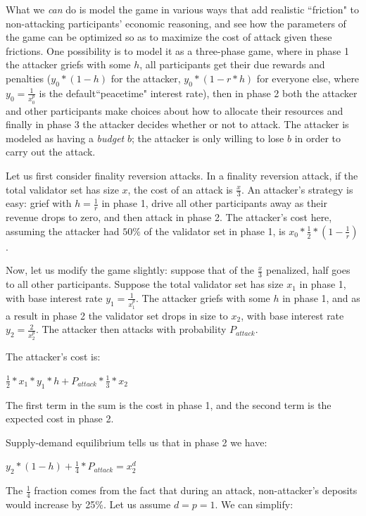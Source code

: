 \documentclass[12pt]{article}
\begin{document}
What we \textit{can} do is model the game in various ways that add realistic ``friction" to non-attacking participants' economic reasoning, and see how the parameters of the game can be optimized so as to maximize the cost of attack given these frictions. One possibility is to model it as a three-phase game, where in phase 1 the attacker griefs with some $h$, all participants get their due rewards and penalties ($y_0 * (1 - h)$ for the attacker, $y_0 * (1- r * h)$ for everyone else, where $y_0 = \frac{1}{x_0^p}$ is the default``peacetime" interest rate), then in phase 2 both the attacker and other participants make choices about how to allocate their resources and finally in phase 3 the attacker decides whether or not to attack. The attacker is modeled as having a \textit{budget} $b$; the attacker is only willing to lose $b$ in order to carry out the attack.

Let us first consider finality reversion attacks. In a finality reversion attack, if the total validator set has size $x$, the cost of an attack is $\frac{x}{3}$. An attacker's strategy is easy: grief with $h = \frac{1}{r}$ in phase 1, drive all other participants away as their revenue drops to zero, and then attack in phase 2. The attacker's cost here, assuming the attacker had $50\%$ of the validator set in phase 1, is $x_0 * \frac{1}{2} * (1 - \frac{1}{r})$.

Now, let us modify the game slightly: suppose that of the $\frac{x}{3}$ penalized, half goes to all other participants. Suppose the total validator set has size $x_1$ in phase 1, with base interest rate $y_1 = \frac{1}{x_1^p}$. The attacker griefs with some $h$ in phase 1, and as a result in phase 2 the validator set drops in size to $x_2$, with base interest rate $y_2 = \frac{2}{x_2^p}$. The attacker then attacks with probability $P_{attack}$.

The attacker's cost is:

$\frac{1}{2} * x_1 * y_1 * h + P_{attack} * \frac{1}{3} * x_2$

The first term in the sum is the cost in phase 1, and the second term is the expected cost in phase 2.

Supply-demand equilibrium tells us that in phase 2 we have:

$y_2 * (1-h) + \frac{1}{4} * P_{attack} = x_2^d$

The $\frac{1}{4}$ fraction comes from the fact that during an attack, non-attacker's deposits would increase by 25\%. Let us assume $d = p = 1$. We can simplify:
\end{document}
